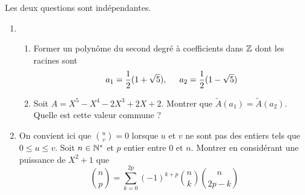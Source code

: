 Les deux questions sont indépendantes.
\begin{enumerate}
 \item 
\begin{enumerate}
 \item Former un polynôme du second degré à coefficients dans $\mathbb{Z}$ dont les racines sont
\begin{displaymath}
 a_1=\frac{1}{2}(1+\sqrt{5}),\hspace{0.5cm} a_2=\frac{1}{2}(1-\sqrt{5})
\end{displaymath}
\item Soit $A=X^5-X^4-2X^3+2X+2$. Montrer que $\widetilde{A}(a_1)=\widetilde{A}(a_2)$. Quelle est cette valeur commune ?
\end{enumerate}
\item On convient ici que $\binom{u}{v}=0$ lorsque $u$ et $v$ ne sont pas des entiers tels que $0\leq u \leq v$. Soit $n\in \mathbb{N}^*$ et $p$ entier entre $0$ et $n$. Montrer en considérant une puissance de $X^2+1$ que
\begin{displaymath}
 \binom{n}{p}= 
\sum_{k=0}^{2p}(-1)^{k+p}\binom{n}{k}\binom{n}{2p-k}
\end{displaymath}

\end{enumerate}
